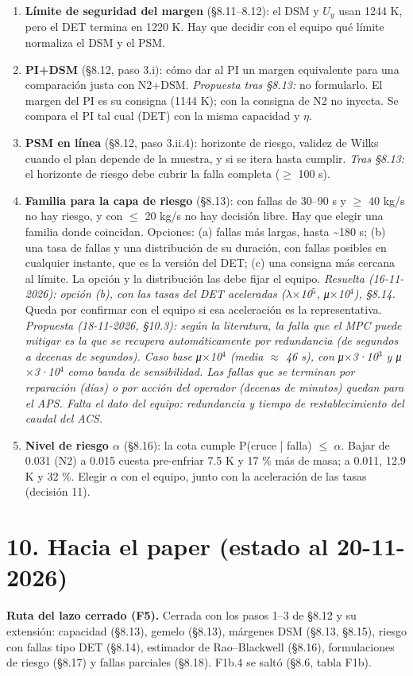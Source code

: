 \documentclass[11pt,a4paper]{article}
\begin{document}
\begin{enumerate}
\item \textbf{Límite de seguridad del margen} (\S{}8.11–8.12): el DSM y $U_y$ usan 1244 K, pero el DET termina en 1220 K. Hay que decidir con el equipo qué límite normaliza el DSM y el PSM.
\item \textbf{PI+DSM} (\S{}8.12, paso 3.i): cómo dar al PI un margen equivalente para una comparación justa con N2+DSM. \emph{Propuesta tras \S{}8.13:} no formularlo. El margen del PI es su consigna (1144 K); con la consigna de N2 no inyecta. Se compara el PI tal cual (DET) con la misma capacidad y $\eta$.
\item \textbf{PSM en línea} (\S{}8.12, paso 3.ii.4): horizonte de riesgo, validez de Wilks cuando el plan depende de la muestra, y si se itera hasta cumplir. \emph{Tras \S{}8.13:} el horizonte de riesgo debe cubrir la falla completa ($\ge$ 100 s).
\item \textbf{Familia para la capa de riesgo} (\S{}8.13): con fallas de 30–90 s y $\ge$ 40 kg/s no hay riesgo, y con $\le$ 20 kg/s no hay decisión libre. Hay que elegir una familia donde coincidan. Opciones: (a) fallas más largas, hasta \textasciitilde{}180 s; (b) una tasa de fallas y una distribución de su duración, con fallas posibles en cualquier instante, que es la versión del DET; (c) una consigna más cercana al límite. La opción y la distribución las debe fijar el equipo. \emph{Resuelta (16-11-2026): opción (b), con las tasas del DET aceleradas ($\lambda$$\times$10$^{5}$, μ$\times$10$^{4}$), \S{}8.14.} Queda por confirmar con el equipo si esa aceleración es la representativa. \emph{Propuesta (18-11-2026, \S{}10.3): según la literatura, la falla que el MPC puede mitigar es la que se recupera automáticamente por redundancia (de segundos a decenas de segundos). Caso base μ$\times$10$^{4}$ (media $\approx$ 46 s), con μ$\times$3·10$^{3}$ y μ$\times$3·10$^{4}$ como banda de sensibilidad. Las fallas que se terminan por reparación (días) o por acción del operador (decenas de minutos) quedan para el APS. Falta el dato del equipo: redundancia y tiempo de restablecimiento del caudal del ACS.}
\item \textbf{Nivel de riesgo $\alpha$} (\S{}8.16): la cota cumple P(cruce | falla) $\le$ $\alpha$. Bajar de 0.031 (N2) a 0.015 cuesta pre-enfriar 7.5 K y 17 \% más de masa; a 0.011, 12.9 K y 32 \%. Elegir $\alpha$ con el equipo, junto con la aceleración de las tasas (decisión 11).
\end{enumerate}

\medskip
\section*{10. Hacia el paper (estado al 20-11-2026)}
\textbf{Ruta del lazo cerrado (F5).} Cerrada con los pasos 1–3 de \S{}8.12 y su extensión: capacidad (\S{}8.13), gemelo (\S{}8.13), márgenes DSM (\S{}8.13, \S{}8.15), riesgo con fallas tipo DET (\S{}8.14), estimador de Rao–Blackwell (\S{}8.16), formulaciones de riesgo (\S{}8.17) y fallas parciales (\S{}8.18). F1b.4 se saltó (\S{}8.6, tabla F1b).
\end{document}
